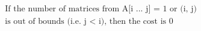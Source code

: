 \documentclass[preview]{standalone}
\begin{document}
\begin{center}
\begin{align*}
&\text{If the number of matrices from A[i ... j] = 1 or (i, j)}\\
&\text{is out of bounds (i.e. j $<$ i), then the cost is 0}
\end{align*}
\end{center}
\end{document}
